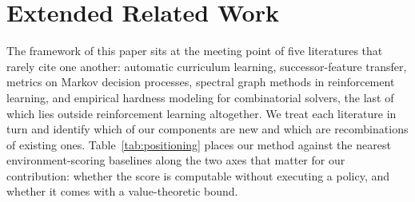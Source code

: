 \documentclass[twoside]{article}
\begin{document}





\clearpage
\appendix
\thispagestyle{empty}
\onecolumn
{}

\section{Extended Related Work}
\label{app:related}



The framework of this paper sits at the meeting point of five literatures that rarely cite one another: automatic curriculum learning, successor-feature transfer, metrics on Markov decision processes, spectral graph methods in reinforcement learning, and empirical hardness modeling for combinatorial solvers, the last of which lies outside reinforcement learning altogether. We treat each literature in turn and identify which of our components are new and which are recombinations of existing ones. Table~\ref{tab:positioning} places our method against the nearest environment-scoring baselines along the two axes that matter for our contribution: whether the score is computable without executing a policy, and whether it comes with a value-theoretic bound.
\end{document}

